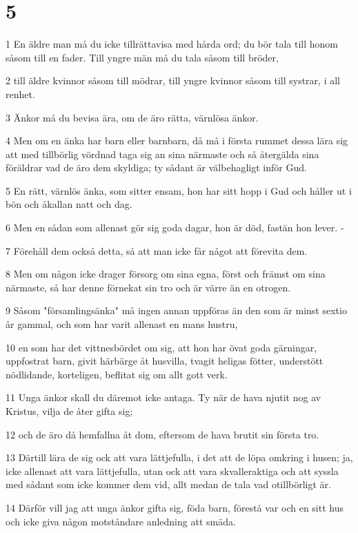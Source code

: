 \chapter{5}

\par 1 En äldre man må du icke tillrättavisa med hårda ord; du bör tala till honom såsom till en fader. Till yngre män må du tala såsom till bröder,
\par 2 till äldre kvinnor såsom till mödrar, till yngre kvinnor såsom till systrar, i all renhet.
\par 3 Änkor må du bevisa ära, om de äro rätta, värnlösa änkor.
\par 4 Men om en änka har barn eller barnbarn, då må i första rummet dessa lära sig att med tillbörlig vördnad taga sig an sina närmaste och så återgälda sina föräldrar vad de äro dem skyldiga; ty sådant är välbehagligt inför Gud.
\par 5 En rätt, värnlös änka, som sitter ensam, hon har sitt hopp i Gud och håller ut i bön och åkallan natt och dag.
\par 6 Men en sådan som allenast gör sig goda dagar, hon är död, fastän hon lever. -
\par 7 Förehåll dem också detta, så att man icke får något att förevita dem.
\par 8 Men om någon icke drager försorg om sina egna, först och främst om sina närmaste, så har denne förnekat sin tro och är värre än en otrogen.
\par 9 Såsom "församlingsänka" må ingen annan uppföras än den som är minst sextio år gammal, och som har varit allenast en mans hustru,
\par 10 en som har det vittnesbördet om sig, att hon har övat goda gärningar, uppfostrat barn, givit härbärge åt husvilla, tvagit heligas fötter, understött nödlidande, korteligen, beflitat sig om allt gott verk.
\par 11 Unga änkor skall du däremot icke antaga. Ty när de hava njutit nog av Kristus, vilja de åter gifta sig;
\par 12 och de äro då hemfallna åt dom, eftersom de hava brutit sin första tro.
\par 13 Därtill lära de sig ock att vara lättjefulla, i det att de löpa omkring i husen; ja, icke allenast att vara lättjefulla, utan ock att vara skvalleraktiga och att syssla med sådant som icke kommer dem vid, allt medan de tala vad otillbörligt är.
\par 14 Därför vill jag att unga änkor gifta sig, föda barn, förestå var och en sitt hus och icke giva någon motståndare anledning att smäda.

